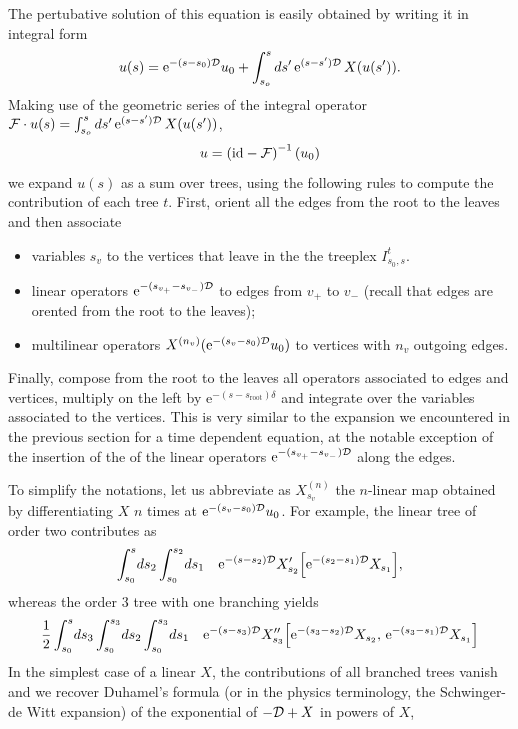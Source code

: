 \documentclass[10pt,here,feynmf]{article}
\begin{document}
The pertubative solution of this equation is easily obtained by writing it in integral form
\begin{equation}
u(s)=\mathrm{e}^{-(s-s_{0}){\cal D}}u_{0}+\int_{s_{o}}^{s}ds'\, \mathrm{e}^{(s-s'){\cal D}}\,X(u(s')).\label{fixedrg}
\end{equation}
Making use of the geometric series of the integral operator ${\cal F}\cdot u(s)=\int_{s_{o}}^{s}ds'\, \mathrm{e}^{(s-s'){\cal D}}\,X(u(s'))$, 
\begin{equation}
u=\left(\mathrm{id}-{\cal F}\right)^{-1}(u_{0})\label{diffpert}
\end{equation}
we expand $u(s)$ as a sum over trees,  using the following rules to compute the contribution of each tree $t$. First, orient all the edges from the root to the leaves and then associate 

\begin{itemize}

\item
variables $s_{v}$ to the vertices that leave in the the treeplex $I_{s_{0},s}^{t}$.

\item
linear operators $\mathrm{e}^{-(s_{v_{+}}-s_{v_{-}}){\cal D}}$ to edges from $v_{+}$ to $v_{-}$ (recall that edges are orented from the root to the leaves); 

\item multilinear operators $X^{(n_{v})}(\mathrm{e}^{-(s_{v}-s_{0}){\cal D}}  u_{0})$
 to vertices with $n_{v}$ outgoing edges.

\end{itemize}

Finally, compose from the root to the leaves all operators
associated to edges and vertices, multiply on the left by $\mathrm{e}^{-(s-s_{\mathrm{root}})\delta}$ and integrate over the variables associated to the vertices. This is very similar to the expansion we encountered in the previous section for a time dependent equation, at the notable exception of the insertion of the of the linear operators  $\mathrm{e}^{-(s_{v_{+}}-s_{v_{-}}){\cal D}}$ along the edges.

To simplify the notations, let us abbreviate as $X_{s_{v}}^{(n)}$ the $n$-linear map obtained by differentiating $X$ $n$ times at $\mathrm{e}^{-(s_{v}-s_{0}){\cal D}}  u_{0}$. For example, the linear tree of order two contributes as
\begin{equation}
\int_{s_{0}}^{s}\! ds_{2}\int_{s_{0}}^{s_{2}}\! ds_{1} \quad
\mathrm{e}^{-(s-s_{2}){\cal D}}
X'_{s_{2}}
\Big[\mathrm{e}^{-(s_{2}-s_{1}){\cal D}} X_{s_{1}}\Big],
\end{equation}
whereas the order 3 tree with one branching yields
\begin{equation}
\frac{1}{2}
\int_{s_{0}}^{s}\! ds_{3}\int_{s_{0}}^{s_{3}}\! ds_{2} 
\int_{s_{0}}^{s_{3}}\! ds_{1} 
\quad
\mathrm{e}^{-(s-s_{3}){\cal D}}
X''_{s_{3}}
\Big[\mathrm{e}^{-(s_{3}-s_{2}){\cal D}} X_{s_{2}},\,
\mathrm{e}^{-(s_{3}-s_{1}){\cal D}} X_{s_{1}}
\Big]
\end{equation}
In the simplest case of a linear $X$, the contributions of all branched trees vanish and we recover Duhamel's formula (or in the physics terminology, the Schwinger-de Witt expansion) of the exponential of $-{\cal D}+X$ in powers of $X$,
\end{document}
